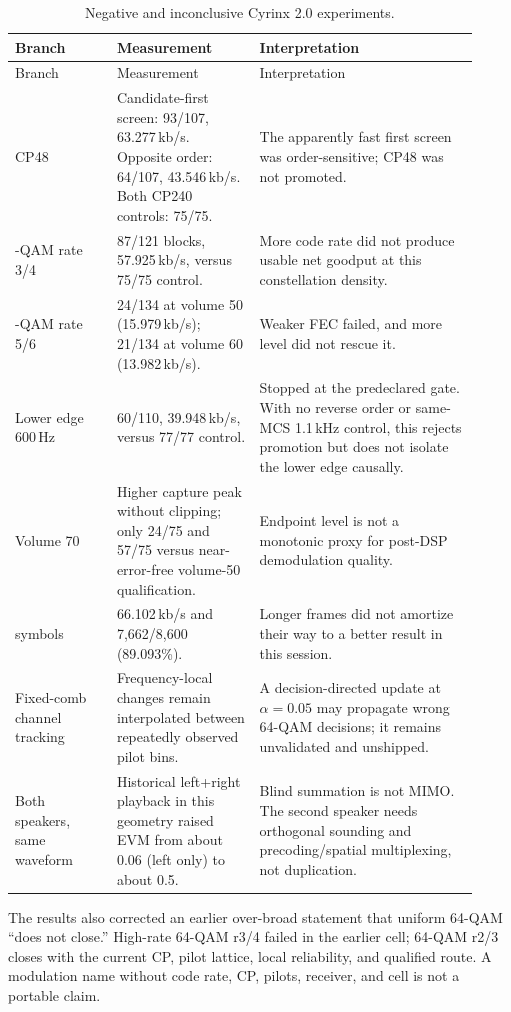 \documentclass[11pt]{article}
\begin{document}
\begin{longtable}{p{0.20\linewidth}p{0.29\linewidth}p{0.43\linewidth}}
\caption{Negative and inconclusive Cyrinx 2.0 experiments.}\label{tab:negative}\\
\toprule
Branch & Measurement & Interpretation \\
\midrule
\endfirsthead
\toprule
Branch & Measurement & Interpretation \\
\midrule
\endhead
CP48 & Candidate-first screen: 93/107, 63.277\,kb/s. Opposite order:
64/107, 43.546\,kb/s. Both CP240 controls: 75/75. & The apparently fast first
screen was order-sensitive; CP48 was not promoted. \\
\addlinespace
64-QAM rate 3/4 & 87/121 blocks, 57.925\,kb/s, versus 75/75 control. & More
code rate did not produce usable net goodput at this constellation density. \\
\addlinespace
64-QAM rate 5/6 & 24/134 at volume 50 (15.979\,kb/s); 21/134 at volume 60
(13.982\,kb/s). & Weaker FEC failed, and more level did not rescue it. \\
\addlinespace
Lower edge 600\,Hz & 60/110, 39.948\,kb/s, versus 77/77 control. & Stopped at
the predeclared gate. With no reverse order or same-MCS 1.1\,kHz control, this
rejects promotion but does not isolate the lower edge causally. \\
\addlinespace
Volume 70 & Higher capture peak without clipping; only 24/75 and 57/75 versus
near-error-free volume-50 qualification. & Endpoint level is not a monotonic
proxy for post-DSP demodulation quality. \\
\addlinespace
128 symbols & 66.102\,kb/s and 7,662/8,600 (89.093\%). & Longer frames did not
amortize their way to a better result in this session. \\
\addlinespace
Fixed-comb channel tracking & Frequency-local changes remain interpolated
between repeatedly observed pilot bins. & A decision-directed update at
$\alpha=0.05$ may propagate wrong 64-QAM decisions; it remains unvalidated and
unshipped. \\
\addlinespace
Both speakers, same waveform & Historical left+right playback in this geometry
raised EVM from about 0.06 (left only) to about 0.5. & Blind summation is not
MIMO. The second speaker needs orthogonal sounding and precoding/spatial
multiplexing, not duplication. \\
\bottomrule
\end{longtable}

The results also corrected an earlier over-broad statement that uniform
64-QAM ``does not close.'' High-rate 64-QAM r3/4 failed in the earlier cell;
64-QAM r2/3 closes with the current CP, pilot lattice, local reliability, and
qualified route. A modulation name without code rate, CP, pilots, receiver,
and cell is not a portable claim.
\end{document}
